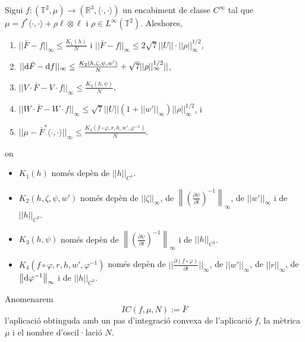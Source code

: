 \begin{teo}
    Sigui $f:(\mathbb T^2, \mu)\to(\mathbb R^3, \langle\cdot, \cdot\rangle)$ un encabiment de classe $C^\infty$ tal que $\mu = f^*\langle\cdot, \cdot\rangle + \rho\ell\otimes\ell$ i $\rho\in L^\infty(\mathbb T^2)$. Aleshores, 
    \begin{enumerate}
        \item $||\bar F-f||_\infty\le\frac{K_1(h)}{N}$ i $||\bar F-f||_\infty\le 2\sqrt7||U||\cdot||\rho||^{1/2}_\infty$,
        \item $||\text d\bar F-\text df||_\infty\le\frac{K_2(h,\zeta,\psi,w')}{N} + \sqrt7||\rho||^{1/2}_\infty||$,
        \item $||V\cdot\bar F-V\cdot f||_\infty\le\frac{K_3(h,\psi)}{N}$,
        \item $||W\cdot\bar F-W\cdot f||_\infty\le\sqrt7||U||(1+||w'||_\infty)||\rho||^{1/2}_\infty$, i
        \item $||\mu - \bar F^*\langle\cdot, \cdot\rangle||_\infty\le\frac{K_4(f\circ\varphi,r,h,w',\varphi^{-1})}{N}$.
    \end{enumerate}
    on 
    \begin{itemize}
        \item $K_1(h)$ només depèn de $||h||_{C^1}$.
        \item $K_2(h,\zeta,\psi,w')$ només depèn de $||\zeta||_\infty$, de $\left\|\left(  \frac{\partial\psi}{\partial t}\right)^{-1}\right\|_\infty$, de $||w'||_\infty$ i de $||h||_{C^2}$.
        \item $K_3(h,\psi)$ només depèn de $\left\|\left(  \frac{\partial\psi}{\partial t}\right)^{-1}\right\|_\infty$ i de $||h||_{C^2}$.
        \item $K_4(f\circ\varphi,r,h,w',\varphi^{-1})$ només depèn de $||\frac{\partial(f\circ\varphi)}{\partial t}||_\infty$, de $||w'||_\infty$, de $||r||_\infty$, de $\left\|\text d\varphi^{-1}\right\|_\infty$ i de $||h||_{C^2}$.
    \end{itemize}
\end{teo}
\begin{nota}
    Anomenarem 
    \begin{equation*}
        IC(f,\mu,N):=\bar F
    \end{equation*}
    l'aplicació obtinguda amb un pas d'integració convexa de l'aplicació $f$, la mètrica $\mu$ i el nombre d'oscil·lació $N$.
\end{nota}
